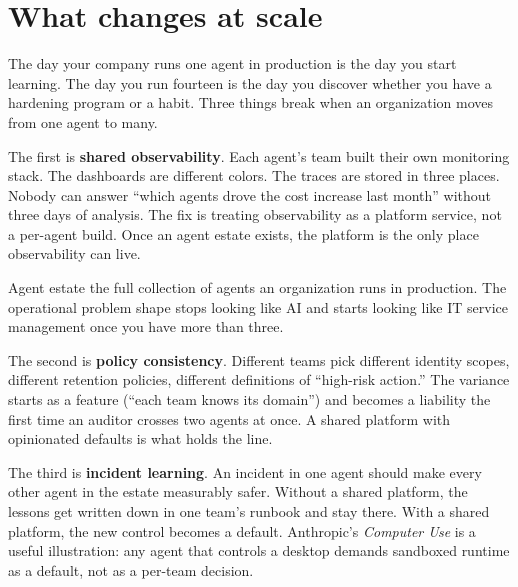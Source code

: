 \label{ch:20-hardening-08-production}

\starttwocol

\section{What changes at scale}

The day your company runs one agent in production is the day you start learning. The day you run fourteen is the day you discover whether you have a hardening program or a habit. Three things break when an organization moves from one agent to many.

The first is \textbf{shared observability}. Each agent's team built their own monitoring stack. The dashboards are different colors. The traces are stored in three places. Nobody can answer ``which agents drove the cost increase last month'' without three days of analysis. The fix is treating observability as a platform service, not a per-agent build. Once an agent estate exists, the platform is the only place observability can live.

\begin{TNdefinition}{Agent estate}
the full collection of agents an organization runs in production. The operational problem shape stops looking like AI and starts looking like IT service management once you have more than three.
\end{TNdefinition}

The second is \textbf{policy consistency}. Different teams pick different identity scopes, different retention policies, different definitions of ``high-risk action.'' The variance starts as a feature (``each team knows its domain'') and becomes a liability the first time an auditor crosses two agents at once. A shared platform with opinionated defaults is what holds the line.

The third is \textbf{incident learning}. An incident in one agent should make every other agent in the estate measurably safer. Without a shared platform, the lessons get written down in one team's runbook and stay there. With a shared platform, the new control becomes a default. Anthropic's \textit{Computer Use} \citep{anthropic-building-agents-2024} is a useful illustration: any agent that controls a desktop demands sandboxed runtime as a default, not as a per-team decision.

